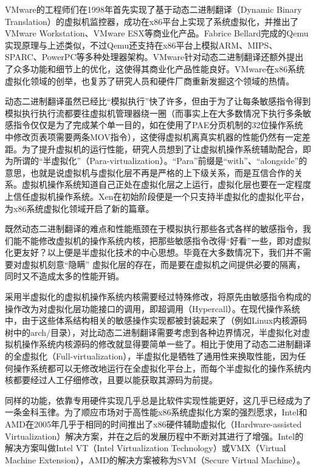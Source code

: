 VMware的工程师们在1998年首先实现了基于动态二进制翻译（Dynamic Binary Translation）的虚拟机监控器，成功在x86平台上实现了系统虚拟化，并推出了VMware Workstation、VMware ESX等商业化产品。Fabrice Bellard完成的Qemu实现原理与上述类似，不过Qemu还支持在x86平台上模拟ARM、MIPS、SPARC、PowerPC等多种处理器架构。VMware针对动态二进制翻译还额外提出了众多功能和细节上的优化，这使得其商业化产品性能良好。VMware在x86系统虚拟化领域的创举，也复苏了研究人员和硬件厂商重新发掘这个领域的热情。

动态二进制翻译虽然已经比``模拟执行''快了许多，但由于为了让每条敏感指令得到模拟执行执行流都要往虚拟机管理器绕一圈（而事实上在大多数情况下执行多条敏感指令仅仅是为了完成某个单一目的，如在使用了PAE分页机制的32位操作系统中修改页表项需要两条MOV指令），这使得虚拟机离真实机器的性能仍然有一定差距。为了提升虚拟机的运行性能，研究人员想到了让虚拟机操作系统辅助配合，即为所谓的``半虚拟化''（Para-virtualization）。``Para''前缀是``with''、``alongside''的意思，也就是说虚拟机与虚拟化层不再是严格的上下级关系，而是互信合作的关系。虚拟机操作系统知道自己正处在虚拟化层之上运行，虚拟化层也要在一定程度上信任虚拟机操作系统。Xen在初始阶段便是一个只支持半虚拟化的虚拟化平台，为x86系统虚拟化领域开启了新的篇章。

既然动态二进制翻译的难点和性能瓶颈在于模拟执行那些各式各样的敏感指令，我们能不能修改虚拟机的操作系统内核，把那些敏感指令改得``好看''一些，即对虚拟化更友好？以上便是半虚拟化技术的中心思想。毕竟在大多数情况下，我们并不需要对虚拟机刻意``隐瞒'' 虚拟化层的存在，而是要在虚拟机之间提供必要的隔离，同时又不造成太多的性能开销。

采用半虚拟化的虚拟机操作系统内核需要经过特殊修改，将原先由敏感指令构成的操作改为对虚拟化层功能接口的调用，即超调用（Hypercall）。在现代操作系统中，由于这些体系结构相关的敏感操作实现都被封装起来了（例如Linux内核源码树中的arch/目录），对比动态二进制翻译需要考虑到各种边界情况，半虚拟化对虚拟机操作系统内核源码的修改就显得要简单一些了。相比于使用了动态二进制翻译的全虚拟化（Full-virtualization），半虚拟化是牺牲了通用性来换取性能，因为任何操作系统都可以无修改地运行在全虚拟化平台上，而每个半虚拟化的操作系统内核都要经过人工仔细修改，且要以能获取其源码为前提。

同样的功能，依靠专用硬件实现几乎总是比软件实现性能更好，这几乎已经成为了一条金科玉律。为了顺应市场对于高性能x86系统虚拟化方案的强烈愿求，Intel和AMD在2005年几乎于相同的时间推出了x86硬件辅助虚拟化（Hardware-assisted Virtualization）解决方案，并在之后的发展历程中不断对其进行了增强。Intel的解决方案叫做Intel VT（Intel Virtualization Technology）或VMX（Virtual Machine Extension），AMD的解决方案被称为SVM（Secure Virtual Machine）。

